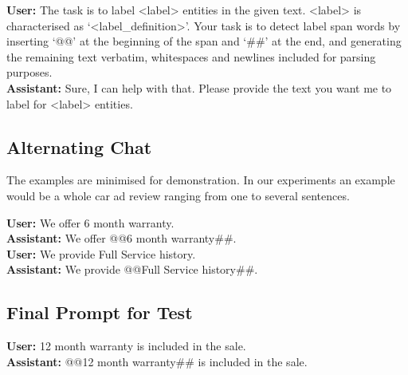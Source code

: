 \documentclass[11pt]{article}
\begin{document}
\begin{tcolorbox}[colback=white,colframe=black!75!black,title=Label Definition]
\textbf{User:} The task is to label <label> entities in the given text. <label> is characterised as `<label\_definition>'. Your task is to detect {label} span words by inserting `@@' at the beginning of the span and `\#\#' at the end, and generating the remaining text verbatim, whitespaces and newlines included for parsing purposes. \\
\textbf{Assistant:} Sure, I can help with that. Please provide the text you want me to label for <label> entities.
\end{tcolorbox}

\subsection{Alternating Chat}
The examples are minimised for demonstration. In our experiments an example would be a whole car ad review ranging from one to several sentences.
\begin{tcolorbox}[colback=white,colframe=black!75!black,title=Sample Prompt for LLM]
\textbf{User:} We offer 6 month warranty. \\
\textbf{Assistant:} We offer @@6 month warranty\#\#. \\
\textbf{User:} We provide Full Service history.\\
\textbf{Assistant:}  We provide @@Full Service history\#\#.
\end{tcolorbox}

\subsection{Final Prompt for Test}
\begin{tcolorbox}[colback=white,colframe=black!75!black,title=Test Sample Prompt]
\textbf{User:} 12 month warranty is included in the sale. \\
\textbf{Assistant:} @@12 month warranty\#\# is included in the sale.
\end{tcolorbox}
\end{document}
